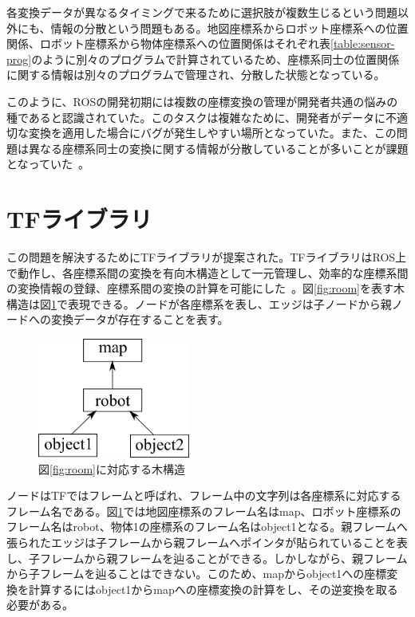 \documentclass[a4paper]{jreport}	%
\begin{document}
各変換データが異なるタイミングで来るために選択肢が複数生じるという問題以外にも、情報の分散という問題もある。地図座標系からロボット座標系への位置関係、ロボット座標系から物体座標系への位置関係はそれぞれ表\ref{table:sensor-prog}のように別々のプログラムで計算されているため、座標系同士の位置関係に関する情報は別々のプログラムで管理され、分散した状態となっている。

このように、ROSの開発初期には複数の座標変換の管理が開発者共通の悩みの種であると認識されていた。このタスクは複雑なために、開発者がデータに不適切な変換を適用した場合にバグが発生しやすい場所となっていた。また、この問題は異なる座標系同士の変換に関する情報が分散していることが多いことが課題となっていた~\cite{tf}。

\section{TFライブラリ}
\label{section:intro-tf}

この問題を解決するためにTFライブラリが提案された。TFライブラリはROS上で動作し、各座標系間の変換を有向木構造として一元管理し、効率的な座標系間の変換情報の登録、座標系間の変換の計算を可能にした~\cite{tf}。図\ref{fig:room}を表す木構造は図\ref{fig:room-tree}で表現できる。ノードが各座標系を表し、エッジは子ノードから親ノードへの変換データが存在することを表す。

\begin{figure}[h] 
\centering
\includegraphics[width=5cm]{tree}	
\caption{図\ref{fig:room}に対応する木構造}
\label{fig:room-tree}
\end{figure}

ノードはTFではフレームと呼ばれ、フレーム中の文字列は各座標系に対応するフレーム名である。図\ref{fig:room-tree}では地図座標系のフレーム名はmap、ロボット座標系のフレーム名はrobot、物体1の座標系のフレーム名はobject1となる。親フレームへ張られたエッジは子フレームから親フレームへポインタが貼られていることを表し、子フレームから親フレームを辿ることができる。しかしながら、親フレームから子フレームを辿ることはできない。このため、mapからobject1への座標変換を計算するにはobject1からmapへの座標変換の計算をし、その逆変換を取る必要がある。
\end{document}
